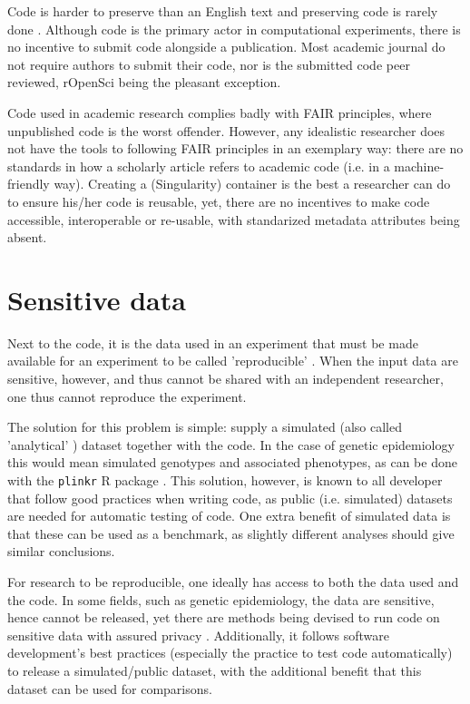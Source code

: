 Code is harder to preserve than an English text
and preserving code is rarely done \cite{barnes2010publish}.
Although code is the primary actor in computational experiments,
there is no incentive to submit code alongside a publication.
Most academic journal do not require authors to submit their code,
nor is the submitted code peer reviewed, 
rOpenSci \cite{ram2018community} being the pleasant exception.

Code used in academic research complies badly with FAIR principles,
where unpublished code is the worst offender.
However, any idealistic researcher does not have the
tools to following FAIR principles in an exemplary way:
there are no standards in how a scholarly article
refers to academic code (i.e. in a machine-friendly way).
Creating a (Singularity) container is the best a researcher
can do to ensure his/her code is reusable,
yet, there are no incentives to make code accessible, interoperable
or re-usable, with standarized metadata attributes being absent.

\section{Sensitive data}\label{sec:sensitive-data}

Next to the code, it is the data used in an experiment 
that must be made available for an experiment 
to be called 'reproducible' \cite{peng2006reproducible}.
When the input data are sensitive, however, and thus cannot be shared with
an independent researcher, one thus cannot reproduce the
experiment.

The solution for this problem is simple:
supply a simulated (also called 'analytical' \cite{peng2006reproducible}) dataset
together with the code.
In the case of genetic epidemiology this would mean
simulated genotypes and associated phenotypes,
as can be done with the \verb|plinkr| R package \cite{plinkr}.
This solution, however, is known to all developer that follow
good practices when writing code, as public (i.e. simulated) 
datasets are needed for automatic testing of code.
One extra benefit of simulated data is that these can be used
as a benchmark, as slightly different analyses should give 
similar conclusions.

For research to be reproducible, one ideally has access to
both the data used and the code.
In some fields, such as genetic epidemiology, the data are
sensitive, hence cannot be released,
yet there are methods being devised to run code on sensitive
data with assured privacy \cite{zhang2016review,azencott2018machine}.
Additionally, it follows software development's best practices 
(especially the practice to test code automatically) 
to release a simulated/public dataset, with
the additional benefit that this dataset can be used for comparisons.

